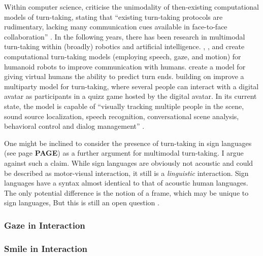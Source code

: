 Within computer science, \citet{chan_designing_2008} criticise the unimodality of then-existing computational models of turn-taking, stating that ``existing turn-taking protocols are rudimentary, lacking many communication cues available in face-to-face collaboration'' \citep[]{chan_designing_2008}.
In the following years, there has been research in multimodal turn-taking within (broadly) robotics and artificial intelligence.
\citet{chao_simon_2011}, \citet{chao_timing_2012}, and \citet{chao_timingmultimodal_2012} create computational turn-taking models (employing speech, gaze, and motion) for humanoid robots to improve communication with humans.
\citet{huang_multimodal_missing} create a model for giving virtual humans the ability to predict turn ends.
\citet{bohus_multiparty_2011}\dash building on \citet{bohus_computational_2010,bohus_facilitating_2010}\dash improve a multiparty model for turn-taking, where several people can interact with a digital avatar as participants in a quizz game hosted by the digital avatar.
In its current state, the model is capable of ``visually tracking multiple people in the scene, sound source localization, speech recognition, conversational scene analysis, behavioral control and dialog management'' \citep[]{bohus_multiparty_2011}.


One might be inclined to consider the presence of turn-taking in sign languages (see page \textbf{PAGE}) as a further argument for multimodal turn-taking.
I argue against such a claim.
While sign languages are obviously not acoustic and could be described as motor-visual interaction, it still is a \emph{linguistic} interaction.
Sign languages have a syntax almost identical to that of acoustic human languages.
The only potential difference is the notion of a frame, which may be unique to sign languages,
But this is still an open question \citep{source}.

\subsubsection{Gaze in Interaction}
\subsubsection{Smile in Interaction}


